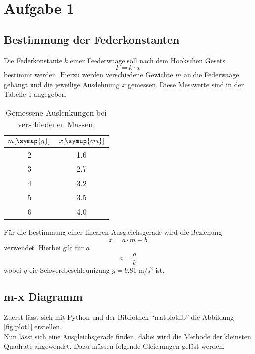 \section{Aufgabe 1}
\subsection{Bestimmung der Federkonstanten}
Die Federkonstante $k$ einer Feederwaage soll nach dem Hookschen Gesetz
\begin{equation}
F = k \cdot x
\label{eqn:hookeq}
\end{equation}
bestimmt werden. Hierzu werden verschiedene Gewichte $m$ an die Federwaage gehängt und die jeweilige Ausdehnung $x$ 
gemessen. Diese Messwerte sind in der Tabelle \ref{tab:gemDaten} angegeben.

\begin{table}
\centering
\caption{Gemessene Auslenkungen bei verschiedenen Massen.}
\label{tab:gemDaten}
\begin{tabular}{c c}
    $m [\symup{g}]$ & $x [\symup{cm}]$ \\
    \midrule
    2 & 1.6 \\
    3 & 2.7 \\
    4 & 3.2 \\
    5 & 3.5 \\
    6 & 4.0 \\
    \bottomrule
\end{tabular}
\end{table}
Für die Bestimmung einer linearen Ausgleichsgerade wird die Beziehung
\begin{equation}
x = a \cdot m + b
\label{eqn:ausglgeradetheorie}
\end{equation}
verwendet. Hierbei gilt für $a$
\begin{equation}
a = \frac{g}{k}
\label{eqn:beschl}
\end{equation}
wobei $g$ die Schwerebeschleunigung $g = \SI{9.81}{\meter\per\second\squared}$ ist.

\subsection{m-x Diagramm}
\begin{flushleft}
Zuerst lässt sich mit Python und der Bibliothek \enquote{matplotlib} die Abbildung \ref{fig:plot1} erstellen.\\
Nun lässt sich eine Ausgleichsgerade finden, dabei wird die Methode der kleinsten Quadrate angewendet. Dazu müssen folgende Gleichungen gelöst werden.
\end{flushleft}

